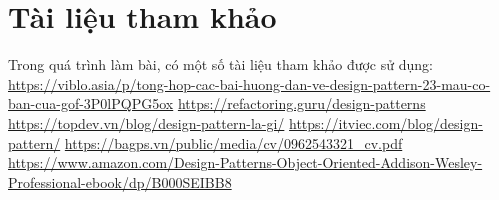 \section{Tài liệu tham khảo}
Trong quá trình làm bài, có một số tài liệu tham khảo được sử dụng:\\
\url{https://viblo.asia/p/tong-hop-cac-bai-huong-dan-ve-design-pattern-23-mau-co-ban-cua-gof-3P0lPQPG5ox}
\url{https://refactoring.guru/design-patterns}
\url{https://topdev.vn/blog/design-pattern-la-gi/}
\url{https://itviec.com/blog/design-pattern/}
\url{https://bagps.vn/public/media/cv/0962543321_cv.pdf}
\url{https://www.amazon.com/Design-Patterns-Object-Oriented-Addison-Wesley-Professional-ebook/dp/B000SEIBB8}